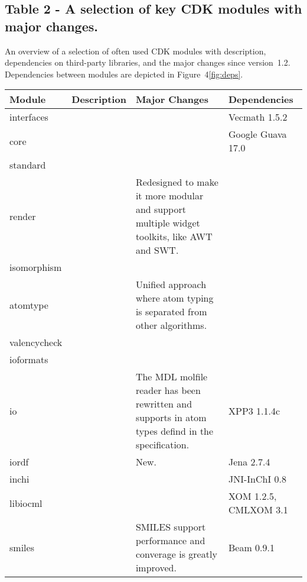 \documentclass[10pt]{bmcart}
\begin{document}
\begin{backmatter}
      \subsection*{Table 2 - A selection of key CDK modules with major changes.}\label{tab:modules}
  An overview of a selection of often used CDK modules with description,
  dependencies on third-party libraries, and the major changes since
  version~1.2. Dependencies between modules are depicted in Figure~4\ref{fig:deps}.
  \baselineskip

    \begin{minipage}{1\textwidth}
    \renewcommand*{\thempfootnote}{\fnsymbol{mpfootnote}}
    \centering
    \begin{tabular}{lp{3cm}p{3cm}l}
  \textbf{Module}            & \textbf{Description}  & \textbf{Major Changes} & \textbf{Dependencies} \\ \hline
  interfaces                 &              & & Vecmath 1.5.2 \\ \hline
  core                       &              & & Google Guava 17.0 \\ \hline %
  standard                   &              & & \\ \hline
  render                     &              & Redesigned to make it more modular and support multiple widget toolkits, like AWT and SWT. & \\ \hline
  isomorphism                &              & & \\ \hline
  atomtype                   &              & Unified approach where atom typing is separated from other algorithms. & \\ \hline
  valencycheck               &              & & \\ \hline
  ioformats                  &              & & \\ \hline
  io                         &              & The MDL molfile reader has been rewritten and supports in atom types defind in the specification. & XPP3 1.1.4c \\ \hline
  iordf                      &              & New. & Jena 2.7.4 \\ \hline
  inchi                      &              & & JNI-InChI 0.8~\cite{Spjuth2013}  \\ \hline
  libiocml                   &              & & XOM 1.2.5, CMLXOM 3.1~\cite{Murray-Rust2011} \\ \hline
  smiles                     &              & SMILES support performance and converage is greatly improved. & Beam 0.9.1~\cite{Beam} \\

\end{tabular}
\end{minipage}
\end{backmatter}
\end{document}
